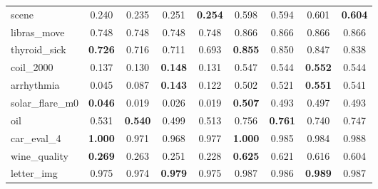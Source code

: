 \begin{figure}[ht]
\begin{tabular}{p{22mm}|*4{p{14mm}}|*4{p{14mm}}}
        scene&\multicolumn{1}{c}{0.240}&\multicolumn{1}{c}{0.235}&\multicolumn{1}{c}{0.251}&\multicolumn{1}{c|}{\textbf{0.254}}&\multicolumn{1}{c}{0.598}&\multicolumn{1}{c}{0.594}&\multicolumn{1}{c}{0.601}&\multicolumn{1}{c}{\textbf{0.604}}\\
        libras\_move&\multicolumn{1}{c}{0.748}&\multicolumn{1}{c}{0.748}&\multicolumn{1}{c}{0.748}&\multicolumn{1}{c|}{0.748}&\multicolumn{1}{c}{0.866}&\multicolumn{1}{c}{0.866}&\multicolumn{1}{c}{0.866}&\multicolumn{1}{c}{0.866}\\
        thyroid\_sick&\multicolumn{1}{c}{\textbf{0.726}}&\multicolumn{1}{c}{0.716}&\multicolumn{1}{c}{0.711}&\multicolumn{1}{c|}{0.693}&\multicolumn{1}{c}{\textbf{0.855}}&\multicolumn{1}{c}{0.850}&\multicolumn{1}{c}{0.847}&\multicolumn{1}{c}{0.838}\\
        coil\_2000&\multicolumn{1}{c}{0.137}&\multicolumn{1}{c}{0.130}&\multicolumn{1}{c}{\textbf{0.148}}&\multicolumn{1}{c|}{0.131}&\multicolumn{1}{c}{0.547}&\multicolumn{1}{c}{0.544}&\multicolumn{1}{c}{\textbf{0.552}}&\multicolumn{1}{c}{0.544}\\
        arrhythmia&\multicolumn{1}{c}{0.045}&\multicolumn{1}{c}{0.087}&\multicolumn{1}{c}{\textbf{0.143}}&\multicolumn{1}{c|}{0.122}&\multicolumn{1}{c}{0.502}&\multicolumn{1}{c}{0.521}&\multicolumn{1}{c}{\textbf{0.551}}&\multicolumn{1}{c}{0.541}\\
        solar\_flare\_m0&\multicolumn{1}{c}{\textbf{0.046}}&\multicolumn{1}{c}{0.019}&\multicolumn{1}{c}{0.026}&\multicolumn{1}{c|}{0.019}&\multicolumn{1}{c}{\textbf{0.507}}&\multicolumn{1}{c}{0.493}&\multicolumn{1}{c}{0.497}&\multicolumn{1}{c}{0.493}\\
        oil&\multicolumn{1}{c}{0.531}&\multicolumn{1}{c}{\textbf{0.540}}&\multicolumn{1}{c}{0.499}&\multicolumn{1}{c|}{0.513}&\multicolumn{1}{c}{0.756}&\multicolumn{1}{c}{\textbf{0.761}}&\multicolumn{1}{c}{0.740}&\multicolumn{1}{c}{0.747}\\
        car\_eval\_4&\multicolumn{1}{c}{\textbf{1.000}}&\multicolumn{1}{c}{0.971}&\multicolumn{1}{c}{0.968}&\multicolumn{1}{c|}{0.977}&\multicolumn{1}{c}{\textbf{1.000}}&\multicolumn{1}{c}{0.985}&\multicolumn{1}{c}{0.984}&\multicolumn{1}{c}{0.988}\\
        wine\_quality&\multicolumn{1}{c}{\textbf{0.269}}&\multicolumn{1}{c}{0.263}&\multicolumn{1}{c}{0.251}&\multicolumn{1}{c|}{0.228}&\multicolumn{1}{c}{\textbf{0.625}}&\multicolumn{1}{c}{0.621}&\multicolumn{1}{c}{0.616}&\multicolumn{1}{c}{0.604}\\
        letter\_img&\multicolumn{1}{c}{0.975}&\multicolumn{1}{c}{0.974}&\multicolumn{1}{c}{\textbf{0.979}}&\multicolumn{1}{c|}{0.975}&\multicolumn{1}{c}{0.987}&\multicolumn{1}{c}{0.986}&\multicolumn{1}{c}{\textbf{0.989}}&\multicolumn{1}{c}{0.987}\\

\end{tabular}
\end{figure}
